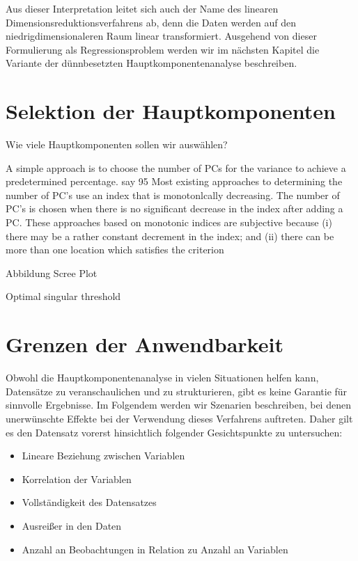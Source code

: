 Aus dieser Interpretation leitet sich auch der Name des linearen Dimensionsreduktionsverfahrens ab, denn die Daten werden auf den niedrigdimensionaleren Raum linear transformiert. Ausgehend von dieser Formulierung als Regressionsproblem werden wir im nächsten Kapitel die Variante der dünnbesetzten Hauptkomponentenanalyse beschreiben.


\section{Selektion der Hauptkomponenten}
\label{selection_principal_components}
Wie viele Hauptkomponenten sollen wir auswählen?

A simple approach is to choose the number of
PCs for the variance to achieve a predetermined
percentage. say 95%
Most existing approaches to determining the number of PC's use an index that is monotonlcally
decreasing. The number of PC's is chosen when
there is no significant decrease in the index after
adding a PC. These approaches based on monotonic indices are subjective because (i) there may
be a rather constant decrement in the index; and
(ii) there can be more than one location which
satisfies the criterion

Abbildung Scree Plot

Optimal singular threshold \cite{gavish}

\section{Grenzen der Anwendbarkeit} \label{theo_results}

Obwohl die Hauptkomponentenanalyse in vielen Situationen helfen kann, Datensätze zu veranschaulichen und zu strukturieren, gibt es keine Garantie für sinnvolle Ergebnisse. Im Folgendem werden wir Szenarien beschreiben, bei denen unerwünschte Effekte bei der Verwendung dieses Verfahrens auftreten. Daher gilt es den Datensatz vorerst hinsichtlich folgender Gesichtspunkte zu untersuchen: 

\begin{itemize}
\item Lineare Beziehung zwischen Variablen
\item Korrelation der Variablen
\item Vollständigkeit des Datensatzes
\item Ausreißer in den Daten
\item Anzahl an Beobachtungen in Relation zu Anzahl an Variablen
\end{itemize}

